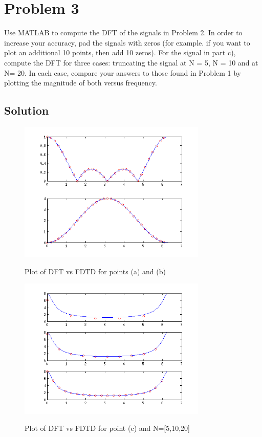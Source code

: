\section*{Problem 3}

Use MATLAB to compute the DFT of the signals in Problem 2. In order to increase your accuracy,
pad the signals with zeros (for example. if you want to plot an additional 10 points, 
then add 10 zeros).
For the signal in part c), compute the DFT for three cases: truncating the signal at 
N = 5, N = 10 and at N= 20. In each case, compare your answers to those found in 
Problem 1 by plotting the magnitude of both versus frequency.

\subsection*{Solution}


\begin{figure}[H]
\caption{Plot of DFT vs FDTD for points (a) and (b)}
\centering
\includegraphics[width=0.8\textwidth]{figs/c4p32.png}
\label{fig:c4p31}
\end{figure} 

\begin{figure}[H]
\caption{Plot of DFT vs FDTD for point (c) and N=[5,10,20]}
\centering
\includegraphics[width=0.8\textwidth]{figs/c4p31.png}
\label{fig:c4p32}
\end{figure} 

